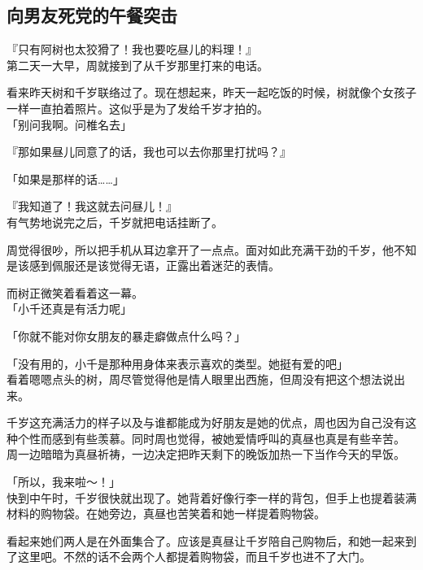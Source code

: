 \subsection{向男友死党的午餐突击}

『只有阿树也太狡猾了！我也要吃昼儿的料理！』\\

第二天一大早，周就接到了从千岁那里打来的电话。

看来昨天树和千岁联络过了。现在想起来，昨天一起吃饭的时候，树就像个女孩子一样一直拍着照片。这似乎是为了发给千岁才拍的。\\

「别问我啊。问椎名去」

『那如果昼儿同意了的话，我也可以去你那里打扰吗？』

「如果是那样的话……」

『我知道了！我这就去问昼儿！』\\

有气势地说完之后，千岁就把电话挂断了。

周觉得很吵，所以把手机从耳边拿开了一点点。面对如此充满干劲的千岁，他不知是该感到佩服还是该觉得无语，正露出着迷茫的表情。

而树正微笑着看着这一幕。\\

「小千还真是有活力呢」

「你就不能对你女朋友的暴走癖做点什么吗？」

「没有用的，小千是那种用身体来表示喜欢的类型。她挺有爱的吧」\\

看着嗯嗯点头的树，周尽管觉得他是情人眼里出西施，但周没有把这个想法说出来。

千岁这充满活力的样子以及与谁都能成为好朋友是她的优点，周也因为自己没有这种个性而感到有些羡慕。同时周也觉得，被她爱情呼叫的真昼也真是有些辛苦。\\

周一边暗暗为真昼祈祷，一边决定把昨天剩下的晚饭加热一下当作今天的早饭。\\

\vspace{2\baselineskip}

「所以，我来啦～！」\\

快到中午时，千岁很快就出现了。她背着好像行李一样的背包，但手上也提着装满材料的购物袋。在她旁边，真昼也苦笑着和她一样提着购物袋。

看起来她们两人是在外面集合了。应该是真昼让千岁陪自己购物后，和她一起来到了这里吧。不然的话不会两个人都提着购物袋，而且千岁也进不了大门。\\


